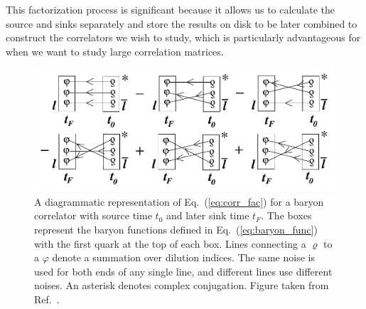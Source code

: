 This factorization process is significant because it allows us to calculate the source and sinks separately and store the results on disk to be later combined to construct the correlators we wish to study, which is particularly advantageous for when we want to study large correlation matrices.
\begin{figure}
    \centering
    \includegraphics[width=6in]{figures/baryon_corr_diag.pdf}
    \caption[A diagrammatic representation of Eq.~(\ref{eq:corr_fac}) for a baryon correlator with source time $t_0$ and later sink time $t_F$.]{A diagrammatic representation of Eq.~(\ref{eq:corr_fac}) for a baryon correlator with source time $t_0$ and later sink time $t_F$. The boxes represent the baryon functions defined in Eq.~(\ref{eq:baryon_func}) with the first quark at the top of each box. Lines connecting a $\varrho$ to a $\varphi$ denote a summation over dilution indices. The same noise is used for both ends of any single line, and different lines use different noises. An asterisk denotes complex conjugation. Figure taken from Ref.~\cite{spectroscopy}.}
    \label{fig:baryon_corr}
\end{figure}